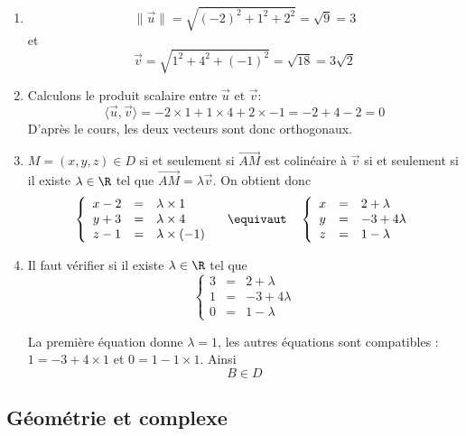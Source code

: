\begin{correction}
\begin{enumerate}
\item $$\|\vec{u} \| = \sqrt{ (-2)^2+1^2 +2^2 }= \sqrt{ 9}=3$$
et 
$$ \vec{v}= \sqrt{ 1^2+4^2 +(-1)^2 }= \sqrt{ 18}=3\sqrt{2}$$
\item Calculons le produit scalaire entre $\vec{u}$ et $\vec{v}$:  $$\langle \vec{u}, \vec{v}\rangle = -2 \times 1 + 1 \times 4 +2\times -1  = -2+4-2=0$$
D'après le cours, les deux vecteurs sont donc orthogonaux. 
\item $M=(x,y,z)\in D$ si et seulement si $\vec{AM}$ est colinéaire à $\vec{v}$ si et seulement si il existe $\lambda \in \R $ tel que $\vec{AM} = \lambda \vec{v}$. On obtient donc 
$$\left\{ \begin{array}{ccl}
x-2&=&\lambda \times 1\\
y+3&=&\lambda \times 4\\
z-1&=&\lambda \times (-1)
\end{array}\right.  \quad \equivaut \quad \left\{ \begin{array}{ccl}
x&=&2+\lambda \\
y&=&-3+4\lambda \\
z&=&1-\lambda 
\end{array}\right.  $$

\item Il faut vérifier si il existe $\lambda \in \R$ tel que 
$$\left\{ \begin{array}{ccl}
3&=&2+\lambda \\
1&=&-3+4\lambda \\
0&=&1-\lambda 
\end{array}\right.  $$

La première équation donne $\lambda=1$, les autres équations sont compatibles : $1 = -3+4\times 1 $ et $ 0 = 1- 1\times 1$.  Ainsi $$B\in D$$
\end{enumerate} 
\end{correction}



\subsection{Géométrie et complexe  }


